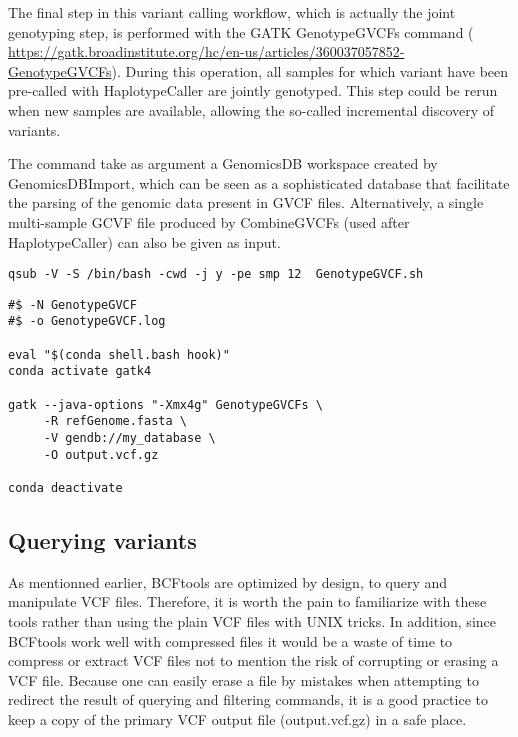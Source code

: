 The final step in this variant calling workflow, which is actually the joint genotyping step, is performed with the GATK GenotypeGVCFs command (  \href{https://gatk.broadinstitute.org/hc/en-us/articles/360037057852-GenotypeGVCFs}{https://gatk.broadinstitute.org/hc/en-us/articles/360037057852-GenotypeGVCFs}). During this operation, all samples for which variant have been pre-called with HaplotypeCaller are jointly genotyped. This step could be rerun when new samples are available, allowing the so-called incremental discovery of variants.


The command take as argument a GenomicsDB workspace created by GenomicsDBImport, which can be seen as a sophisticated database that facilitate the parsing of the genomic data present in GVCF files. Alternatively, a single multi-sample GCVF file produced by CombineGVCFs (used after HaplotypeCaller) can also be given as input.

\begin{verbatim}
qsub -V -S /bin/bash -cwd -j y -pe smp 12  GenotypeGVCF.sh
\end{verbatim}


\begin{verbatim}
#$ -N GenotypeGVCF
#$ -o GenotypeGVCF.log

eval "$(conda shell.bash hook)"
conda activate gatk4

gatk --java-options "-Xmx4g" GenotypeGVCFs \
	 -R refGenome.fasta \
	 -V gendb://my_database \
	 -O output.vcf.gz

conda deactivate
\end{verbatim}




\subsection{Querying variants}


As mentionned earlier, BCFtools are optimized by design, to query and manipulate VCF files. Therefore, it is worth the pain to familiarize with these tools rather than using the plain VCF files with UNIX tricks. In addition, since BCFtools work well with compressed files it would be a waste of time to compress or extract VCF files not to mention the risk of corrupting or erasing a VCF file. Because one can easily erase a file by mistakes when attempting to redirect the result of querying and filtering commands, it is a good practice to keep a copy of the primary VCF output file (output.vcf.gz) in a safe place.

